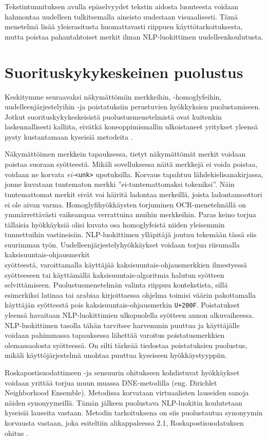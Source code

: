 Tekstintunnituksen avulla epäselvyydet tekstin aidosta luonteesta voidaan hahmontaa uudelleen tulkitsemalla aineisto uudestaan visuaalisesti. Tämä menetelmä lisää yleisrasitusta huomattavasti riippuen käyttötarkoituksesta, mutta poistaa pahantahtoiset merkit ilman NLP-luokittimen uudelleenkoulutusta. \citep{boucher2021bad}

\section{Suorituskykykeskeinen puolustus}
Keskitymme seuraavaksi näkymättömiin merkkeihin, -homoglyfeihin, \-uudelleenjärjestelyihin -ja poistatuksiin perustuvien hyökkyksien puolustamiseen. Jotkut suorituskykykeskeisistä puolustusmenetelmistä ovat kuitenkin laskennallisesti kalliita, eivätkä koneoppimismallin ulkoistaneet yritykset yleensä pysty kustantamaan kyseisiä metodeita \citep{https://doi.org/10.48550/arxiv.1911.07399}.

Näkymättöimen merkkein tapauksessa, tietyt näkymättömät merkit voidaan poistaa suoraan syötteestä. Mikäli sovelluksessa näitä merkkejä ei voida poistaa, voidaan ne korvata \textit{ei-}\texttt{<unk>} upotuksilla. Korvaus tapahtuu lähdekielisanakirjassa, jonne kuvataan tuntematon merkki ''ei-tuntemattomaksi tokeniksi''. Näin tuntemattomat merkit eivät voi häiritä ladontaa merkeillä, joista ladontamoottori ei ole aivan varma. Homoglyfihyökkäysten torjuminen OCR-menetelmällä on ymmärrettävästi vaikeampaa verrattuina muihin merkkeihin. Paras keino torjua tällaisia hyökkäyksiä olisi kuvata osa homoglyfeistä niiden yleisemmin tunnettuihin vastineisiin. NLP-luokittimen ylläpitäjä joutuu tekemään tässä siis suurimman työn. Uudelleenjärjestelyhyökkäykset voidaan torjua riisumalla kaksisuuntais-ohjausmerkit\\syötteestä, varoittamalla käyttäjää kaksisuuntais-ohjausmerkkien ilmestyessä syötteeseen tai käyttämällä kaksisuuntais-algoritmia halutun syötteen selvittämiseen. Puolustusmenetelmän valinta riippuu kontekstista, sillä esimerkiksi latinaa tai arabiaa kirjoittaessa ohjelma toimisi väärin pakottamalla käyttäjän syötteestä pois kaksisuuntais-ohjausmerkin \texttt{U+200F}. Poistatukset yleensä havaitaan NLP-luokittimien ulkopuolella syötteen annon alkuvaiheessa. NLP-luokittimen tasolla tähän tarvitsee harvemmin puuttua ja käyttäjälle voidaan pahimmassa tapauksessa lähettää varoitus poistatusmerkkien olemassaolosta syötteessä. On silti tärkeää tiedostaa poistatuksien puolustus, mikäli käyttöjärjestelmä unohtaa puuttua kyseiseen hyökkäystyyppiin. \citep{boucher2021bad}

Roskapostisuodattimeen -ja sensuurin ohitukseen kohdistuvat hyökkäykset voidaan yrittää torjua muun muassa DNE-metodilla (eng. Dirichlet Neighborhood Ensemble). Metodissa korvataan virtuaalisten lauseiden sanoja näiden synonyymeillä. Tämän jälkeen puolustava NLP-luokitin koulutetaan kyseisiä lauseita vastaan. Metodin tarkoituksena on siis puolustautua synonyymin korvausta vastaan, joka esiteltiin alikappaleessa 2.1, Roskapostisuodatuksen ohitus \citep{dnedefense}.